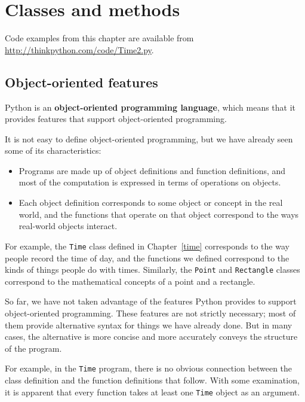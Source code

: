 \documentclass[12pt,a4paper,final,twoside,onecolumn,titlepage]{book}
\begin{document}
\chapter{Classes and methods}

Code examples from this chapter are available from
\url{http://thinkpython.com/code/Time2.py}.

\section{Object-oriented features}

Python is an {\bf object-oriented programming language}, which means
that it provides features that support object-oriented
programming.

It is not easy to define object-oriented programming, but we have
already seen some of its characteristics:

\begin{itemize}

\item Programs are made up of object definitions and function
definitions, and most of the computation is expressed in terms
of operations on objects.

\item Each object definition corresponds to some object or concept
in the real world, and the functions that operate on that object
correspond to the ways real-world objects interact.

\end{itemize}

For example, the {\tt Time} class defined in Chapter~\ref{time}
corresponds to the way people record the time of day, and the
functions we defined correspond to the kinds of things people do with
times.  Similarly, the {\tt Point} and {\tt Rectangle} classes
correspond to the mathematical concepts of a point and a rectangle.

So far, we have not taken advantage of the features Python provides to
support object-oriented programming.  These
features are not strictly necessary; most of them provide
alternative syntax for things we have already done.  But in many cases,
the alternative is more concise and more accurately conveys the
structure of the program.

For example, in the {\tt Time} program, there is no obvious
connection between the class definition and the function definitions
that follow.  With some examination, it is apparent that every function
takes at least one {\tt Time} object as an argument.
\end{document}
